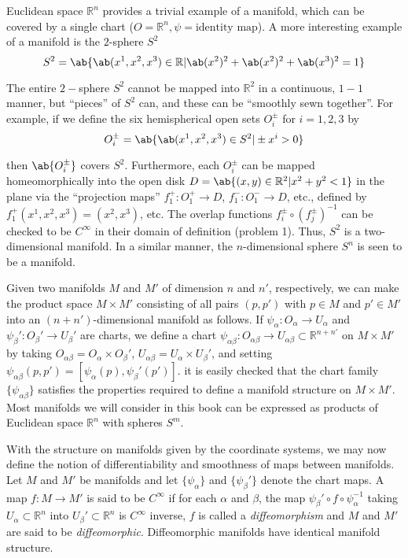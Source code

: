 Euclidean space $\mathbb{R}^n$ provides a trivial example of a manifold, which can be covered by a single chart ($O=\mathbb{R}^n,\psi=\text{identity map}$). A more interesting example of a manifold is the $2$-sphere $S^2$
 \[S^2=\ab\{\ab(x^1,x^2,x^3)\in\mathbb{R}|\ab(x^2)^2+\ab(x^2)^2+\ab(x^3)^2=1\}\]

The entire $2-$sphere $S^2$ cannot be mapped into $\mathbb{R}^2$ in a continuous, $1-1$ manner, but ``pieces'' of $S^2$ can, and these can be ``smoothly sewn together''. For example, if we define the six hemispherical open sets $O_i^\pm$ for $i=1,2,3$ by
\[
    O_i^\pm=\ab\{\ab(x^1,x^2,x^3)\in S^2|\pm x^i>0\}
\]

then $\ab\{O_i^\pm\}$ covers $S^2$. Furthermore, each $O_i^\pm$ can be mapped homeomorphically into the open disk $D=\ab\{(x,y)\in\mathbb{R}^2|x^2+y^2<1\}$ in the plane via the ``projection maps'' $f_1^+:O_1^+\to D$, $f_1^-:O_1^-\to D$, etc., defined by $f_1^+(x^1,x^2,x^3)=(x^2,x^3)$, etc. The overlap functions $f_i^\pm\circ(f_j^\pm)^{-1}$ can be checked to be $C^\infty$ in their domain of definition (problem 1). Thus, $S^2$ is a two-dimensional manifold. In a similar manner, the $n$-dimensional sphere $S^n$ is seen to be a manifold.

Given two manifolds $M$ and $M'$ of dimension $n$ and $n'$, respectively, we can make the product space $M\times M'$ consisting of all pairs $(p,p')$ with $p\in M$ and $p'\in M'$ into an $(n+n')$-dimensional manifold as follows. If $\psi_\alpha:O_\alpha\to U_\alpha$ and $\psi_\beta':O_\beta'\to U_\beta'$ are charts, we define a chart $\psi_{\alpha\beta}:O_{\alpha\beta}\to U_{\alpha\beta}\subset\mathbb{R}^{n+n'}$ on $M\times M'$ by taking $O_{\alpha\beta}=O_\alpha\times O_\beta'$, $U_{\alpha\beta}=U_\alpha\times U_\beta'$, and setting $\psi_{\alpha\beta}(p,p')=[\psi_\alpha(p),\psi_\beta'(p')]$. it is easily checked that the chart family $\{\psi_{\alpha\beta}\}$ satisfies the properties required to define a manifold structure on $M\times M'$. Most manifolds we will consider in this book can be expressed as products of Euclidean space $\mathbb{R}^n$ with spheres $S^m$.

With the structure on manifolds given by the coordinate systems, we may now define the notion of differentiability and smoothness of maps between manifolds. Let $M$ and $M'$ be manifolds and let $\{\psi_\alpha\}$ and $\{\psi_\beta'\}$ denote the chart maps. A map $f:M\to M'$ is said to be $C^\infty$ if for each $\alpha$ and $\beta$, the map $\psi_\beta'\circ f\circ\psi_\alpha^{-1}$ taking $U_\alpha\subset\mathbb{R}^n$ into $U_\beta'\subset\mathbb{R}^n$ is $C^\infty$ inverse, $f$ is called a \emph{diffeomorphism} and $M$ and $M'$ are said to be \emph{diffeomorphic}. Diffeomorphic manifolds have identical manifold structure.

